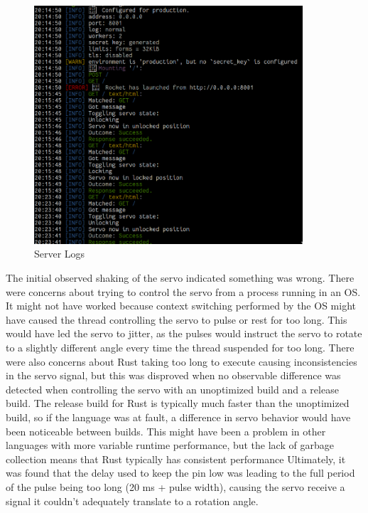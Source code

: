 \documentclass[a4paper]{article}
\begin{document}
\begin{figure}[H]
    \center
    \label{fig:logs}
    \caption{Server Logs}
    \includegraphics[width=10cm]{sesameServerOutput.png}
\end{figure}

The initial observed shaking of the servo indicated something was wrong.
There were concerns about trying to control the servo from a process running in an OS.
It might not have worked because context switching performed by the OS might have caused the thread controlling the servo to pulse or rest for too long.
This would have led the servo to jitter, as the pulses would instruct the servo to rotate to a slightly different angle every time the thread suspended for too long.
There were also concerns about Rust taking too long to execute causing inconsistencies in the servo signal, but this was disproved when no observable difference was detected when controlling the servo with an unoptimized build and a release build.
The release build for Rust is typically much faster than the unoptimized build, so if the language was at fault, a difference in servo behavior would have been noticeable between builds.
This might have been a problem in other languages with more variable runtime performance, but the lack of garbage collection means that Rust typically has consistent performance
Ultimately, it was found that the delay used to keep the pin low was leading to the full period of the pulse being too long (20 ms + pulse width), causing the servo receive a signal it couldn't adequately translate to a rotation angle.
\end{document}
